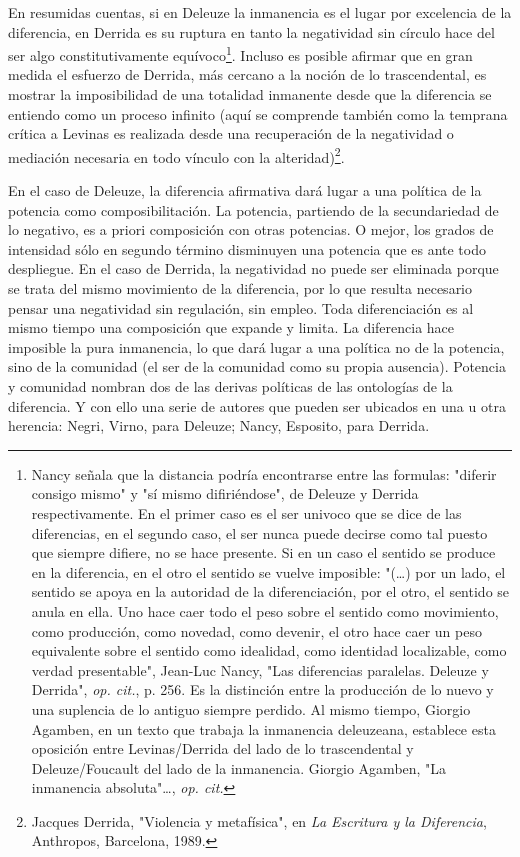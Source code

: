 \documentclass{book}
\begin{document}
En resumidas cuentas, si en Deleuze la inmanencia es el lugar por
excelencia de la diferencia, en Derrida es su ruptura en tanto la
negatividad sin círculo hace del ser algo constitutivamente
equívoco\footnote{Nancy señala que la distancia podría encontrarse entre
  las formulas: "diferir consigo mismo" y "sí mismo difiriéndose", de
  Deleuze y Derrida respectivamente. En el primer caso es el ser univoco
  que se dice de las diferencias, en el segundo caso, el ser nunca puede
  decirse como tal puesto que siempre difiere, no se hace presente. Si
  en un caso el sentido se produce en la diferencia, en el otro el
  sentido se vuelve imposible: "(\dots) por un lado, el sentido se
  apoya en la autoridad de la diferenciación, por el otro, el sentido se
  anula en ella. Uno hace caer todo el peso sobre el sentido como
  movimiento, como producción, como novedad, como devenir, el otro hace
  caer un peso equivalente sobre el sentido como idealidad, como
  identidad localizable, como verdad presentable", Jean-Luc Nancy, "Las
  diferencias paralelas. Deleuze y Derrida", \emph{op. cit.}, p. 256. Es
  la distinción entre la producción de lo nuevo y una suplencia de lo
  antiguo siempre perdido. Al mismo tiempo, Giorgio Agamben, en un texto
  que trabaja la inmanencia deleuzeana, establece esta oposición entre
  Levinas/Derrida del lado de lo trascendental y Deleuze/Foucault del
  lado de la inmanencia. Giorgio Agamben, "La inmanencia
  absoluta"\ldots, \emph{op. cit.}}. Incluso es posible afirmar que en
gran medida el esfuerzo de Derrida, más cercano a la noción de lo
trascendental, es mostrar la imposibilidad de una totalidad inmanente
desde que la diferencia se entiendo como un proceso infinito (aquí se
comprende también como la temprana crítica a Levinas es realizada desde
una recuperación de la negatividad o mediación necesaria en todo vínculo
con la alteridad)\footnote{Jacques Derrida, "Violencia y metafísica", en
  \emph{La Escritura y la Diferencia}, Anthropos, Barcelona, 1989.}.

En el caso de Deleuze, la diferencia afirmativa dará lugar a una
política de la potencia como composibilitación. La potencia, partiendo
de la secundariedad de lo negativo, es a priori composición con otras
potencias. O mejor, los grados de intensidad sólo en segundo término
disminuyen una potencia que es ante todo despliegue. En el caso de
Derrida, la negatividad no puede ser eliminada porque se trata del mismo
movimiento de la diferencia, por lo que resulta necesario pensar una
negatividad sin regulación, sin empleo. Toda diferenciación es al mismo
tiempo una composición que expande y limita. La diferencia hace
imposible la pura inmanencia, lo que dará lugar a una política no de la
potencia, sino de la comunidad (el ser de la comunidad como su propia
ausencia). Potencia y comunidad nombran dos de las derivas políticas de
las ontologías de la diferencia. Y con ello una serie de autores que
pueden ser ubicados en una u otra herencia: Negri, Virno, para Deleuze;
Nancy, Esposito, para Derrida.
\end{document}
